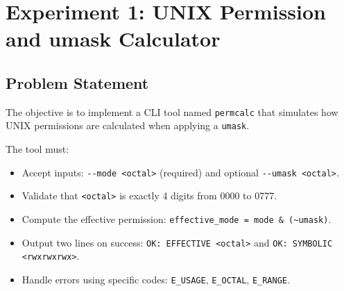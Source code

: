 
\section{Experiment 1: UNIX Permission and umask Calculator}

\subsection{Problem Statement}
The objective is to implement a CLI tool named \texttt{permcalc} that simulates how UNIX permissions are calculated when applying a \texttt{umask}.

The tool must:
\begin{itemize}
    \item Accept inputs: \verb|--mode <octal>| (required) and optional \verb|--umask <octal>|.
    \item Validate that \verb|<octal>| is exactly 4 digits from 0000 to 0777.
    \item Compute the effective permission: \verb|effective_mode = mode & (~umask)|.
    \item Output two lines on success: \verb|OK: EFFECTIVE <octal>| and \verb|OK: SYMBOLIC <rwxrwxrwx>|.
    \item Handle errors using specific codes: \verb|E_USAGE|, \verb|E_OCTAL|, \verb|E_RANGE|.
\end{itemize}


